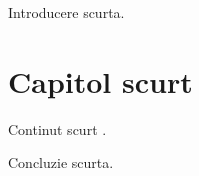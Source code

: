 \documentclass[a4paper,12pt]{report}
\begin{document}
\introChapter
Introducere scurta.

\chapter{Capitol scurt}
Continut scurt \cite{png_spec}.

\finalConclusionChapter
Concluzie scurta.

\bibliographyChapter
\end{document}
